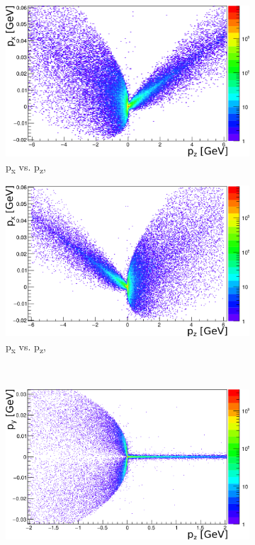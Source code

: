 \begin{figure}
    \centering
    \begin{subfigure}[b]{0.49\textwidth}
    \centering
        \includegraphics[height=0.21\textheight]{figures/Momentumx_Momentumz.png}
        \caption{p\textsubscript{x} vs. p\textsubscript{z}, \Pem}
	\label{fig:px_pz_ele}
    \end{subfigure}
    \begin{subfigure}[b]{0.49\textwidth}
    \centering
        \includegraphics[height=0.21\textheight]{figures/Momentumx_Momentumz_Positrons.png}
        \caption{p\textsubscript{x} vs. p\textsubscript{z}, \Pep}
        \label{fig:px_pz_posi}
    \end{subfigure}\\
    \begin{subfigure}[b]{0.49\textwidth}
    \centering
        \includegraphics[height=0.21\textheight]{figures/Momentumy_Momentumz.png}

\end{subfigure}
\end{figure}
